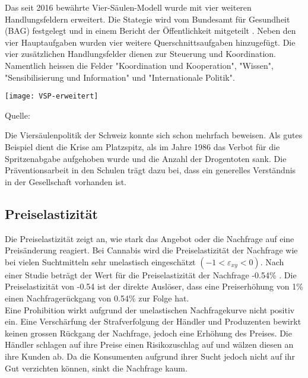 \documentclass[../main.tex]{subfiles}
\begin{document}
	\noindent
	Das seit 2016 bewährte Vier-Säulen-Modell wurde mit vier weiteren Handlungsfeldern erweitert. 
	Die Stategie wird vom Bundesamt für Gesundheit (BAG) festgelegt und in einem Bericht der Öffentlichkeit mitgeteilt \cite{bag-2015}.	
	Neben den vier Hauptaufgaben wurden vier weitere Querschnittsaufgaben hinzugefügt.
	Die vier zusätzlichen Handlungsfelder dienen zur Steuerung und Koordination.
	Namentlich heissen die Felder "Koordination und Kooperation", "Wissen", "Sensibilisierung und Information" und "Internationale Politik".

	\noindent
	{
		\centering
		\texttt{[image: VSP-erweitert]}
		\captionsetup{font=small}
		\small 
		\noindent
		\begin{center}
		Quelle: \cite{bag-2015}
		\end{center}
	}
	
	\noindent
	Die Viersäulenpolitik der Schweiz konnte sich schon mehrfach beweisen.
	Als gutes Beispiel dient die Krise am Platzspitz, als im Jahre 1986 das Verbot für die Spritzenabgabe aufgehoben wurde und die Anzahl der Drogentoten sank.
	Die Präventionsarbeit in den Schulen trägt dazu bei, dass ein generelles Verständnis in der Gesellschaft vorhanden ist.
	
	\subsection{Preiselastizität}
	Die Preiselastizität zeigt an, wie stark das Angebot oder die Nachfrage auf eine Preisänderung reagiert.
	Bei Cannabis wird die Preiselastizität der Nachfrage wie bei vielen Suchtmitteln sehr unelastisch eingeschätzt $(-1<\varepsilon_{xy}<0)$. 
	Nach einer Studie beträgt der Wert für die Preiselastizität der Nachfrage -0.54\% \cite{golzar}.
	Die Preiselastizität von -0.54 ist der direkte Auslöser, dass eine Preiserhöhung von 1\% einen Nachfragerückgang von 0.54\% zur Folge hat.\\
	
	\noindent
	Eine Prohibition wirkt aufgrund der unelastischen Nachfragekurve nicht positiv ein.
	Eine Verschärfung der Strafverfolgung der Händler und Produzenten bewirkt keinen grossen Rückgang der Nachfrage, jedoch eine Erhöhung des Preises.
	Die Händler schlagen auf ihre Preise einen Risikozuschlag auf und wälzen diesen an ihre Kunden ab.
	Da die Konsumenten aufgrund ihrer Sucht jedoch nicht auf ihr Gut verzichten können, sinkt die Nachfrage kaum.\\
	
\end{document}

